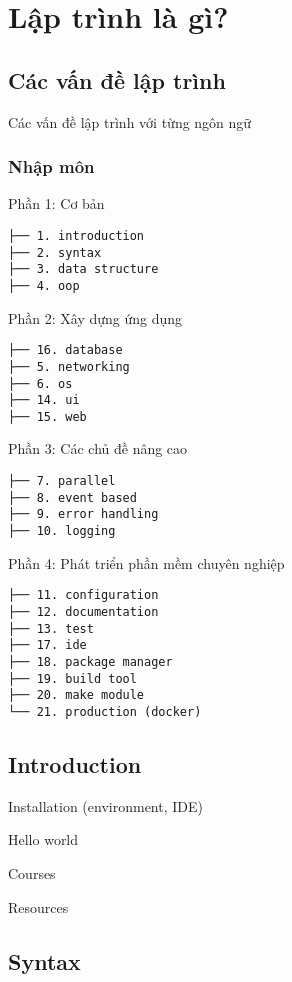 \chapter{Lập trình là gì?}

\section{Các vấn đề lập trình}

Các vấn đề lập trình với từng ngôn ngữ

\subsection{Nhập môn}

Phần 1: Cơ bản

\begin{lstlisting}
├── 1. introduction
├── 2. syntax
├── 3. data structure
├── 4. oop
\end{lstlisting}

Phần 2: Xây dựng ứng dụng

\begin{lstlisting}
├── 16. database
├── 5. networking
├── 6. os
├── 14. ui
├── 15. web
\end{lstlisting}

Phần 3: Các chủ đề nâng cao

\begin{lstlisting}
├── 7. parallel
├── 8. event based
├── 9. error handling
├── 10. logging
\end{lstlisting}

Phần 4: Phát triển phần mềm chuyên nghiệp

\begin{lstlisting}
├── 11. configuration
├── 12. documentation
├── 13. test
├── 17. ide
├── 18. package manager
├── 19. build tool
├── 20. make module
└── 21. production (docker)
\end{lstlisting}

\section{Introduction}

Installation (environment, IDE)

Hello world

Courses

Resources


\section{Syntax}

